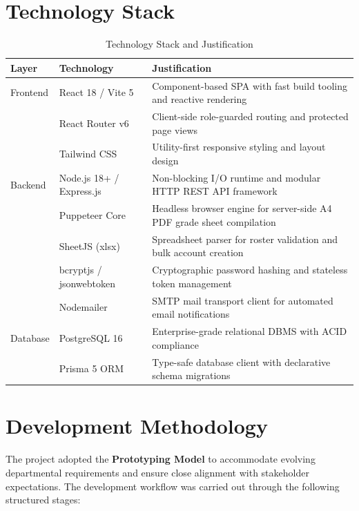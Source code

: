 \section{Technology Stack}
\begin{table}[H]
\centering
\caption{Technology Stack and Justification}
\label{tab:tech_stack}
\vspace{4pt}
\small
\begin{tabularx}{\textwidth}{@{}l p{4.2cm} X@{}}
\toprule
\textbf{Layer} & \textbf{Technology} & \textbf{Justification} \\
\midrule
Frontend       & React 18 / Vite 5       & Component-based SPA with fast build tooling and reactive rendering \\
               & React Router v6         & Client-side role-guarded routing and protected page views \\
               & Tailwind CSS            & Utility-first responsive styling and layout design \\
\midrule
Backend        & Node.js 18+ / Express.js & Non-blocking I/O runtime and modular HTTP REST API framework \\
               & Puppeteer Core          & Headless browser engine for server-side A4 PDF grade sheet compilation \\
               & SheetJS (xlsx)          & Spreadsheet parser for roster validation and bulk account creation \\
               & bcryptjs / jsonwebtoken & Cryptographic password hashing and stateless token management \\
               & Nodemailer              & SMTP mail transport client for automated email notifications \\
\midrule
Database       & PostgreSQL 16           & Enterprise-grade relational DBMS with ACID compliance \\
               & Prisma 5 ORM            & Type-safe database client with declarative schema migrations \\
\bottomrule
\end{tabularx}
\end{table}

\section{Development Methodology}
The project adopted the \textbf{Prototyping Model} to accommodate evolving departmental requirements and ensure close alignment with stakeholder expectations. The development workflow was carried out through the following structured stages:

